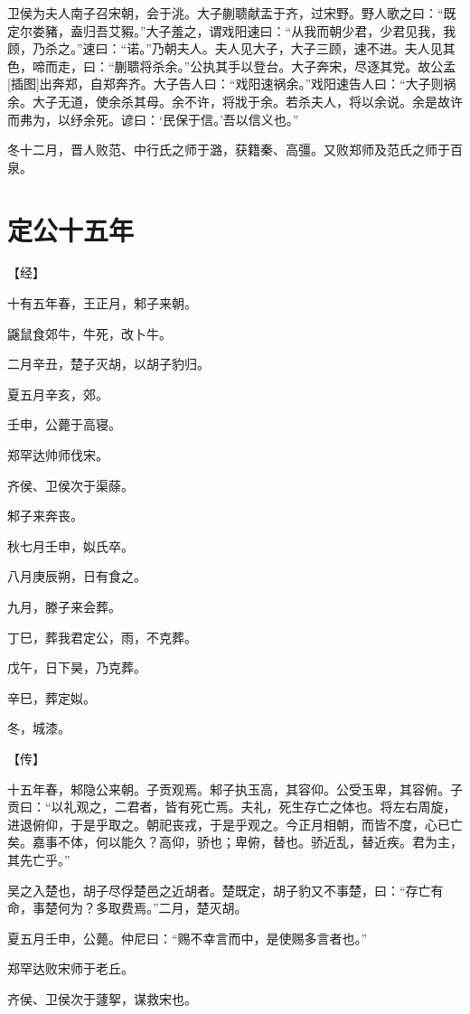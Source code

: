 \documentclass[a4paper,12pt,UTF8,twoside]{ctexbook}
\begin{document}
卫侯为夫人南子召宋朝，会于洮。大子蒯聩献盂于齐，过宋野。野人歌之曰：“既定尔娄豬，盍归吾艾豭。”大子羞之，谓戏阳速曰：“从我而朝少君，少君见我，我顾，乃杀之。”速曰：“诺。”乃朝夫人。夫人见大子，大子三顾，速不进。夫人见其色，啼而走，曰：“蒯聩将杀余。”公执其手以登台。大子奔宋，尽逐其党。故公孟[插图]出奔郑，自郑奔齐。大子告人曰：“戏阳速祸余。”戏阳速告人曰：“大子则祸余。大子无道，使余杀其母。余不许，将戕于余。若杀夫人，将以余说。余是故许而弗为，以纾余死。谚曰：‘民保于信。’吾以信义也。”

冬十二月，晋人败范、中行氏之师于潞，获籍秦、高彊。又败郑师及范氏之师于百泉。


\chapter{定公十五年}



【经】

十有五年春，王正月，邾子来朝。

鼷鼠食郊牛，牛死，改卜牛。

二月辛丑，楚子灭胡，以胡子豹归。

夏五月辛亥，郊。

壬申，公薨于高寝。

郑罕达帅师伐宋。

齐侯、卫侯次于渠蒢。

邾子来奔丧。

秋七月壬申，姒氏卒。

八月庚辰朔，日有食之。

九月，滕子来会葬。

丁巳，葬我君定公，雨，不克葬。

戊午，日下昊，乃克葬。

辛巳，葬定姒。

冬，城漆。

【传】

十五年春，邾隐公来朝。子贡观焉。邾子执玉高，其容仰。公受玉卑，其容俯。子贡曰：“以礼观之，二君者，皆有死亡焉。夫礼，死生存亡之体也。将左右周旋，进退俯仰，于是乎取之。朝祀丧戎，于是乎观之。今正月相朝，而皆不度，心已亡矣。嘉事不体，何以能久？高仰，骄也；卑俯，替也。骄近乱，替近疾。君为主，其先亡乎。”

吴之入楚也，胡子尽俘楚邑之近胡者。楚既定，胡子豹又不事楚，曰：“存亡有命，事楚何为？多取费焉。”二月，楚灭胡。

夏五月壬申，公薨。仲尼曰：“赐不幸言而中，是使赐多言者也。”

郑罕达败宋师于老丘。

齐侯、卫侯次于蘧挐，谋救宋也。
\end{document}

